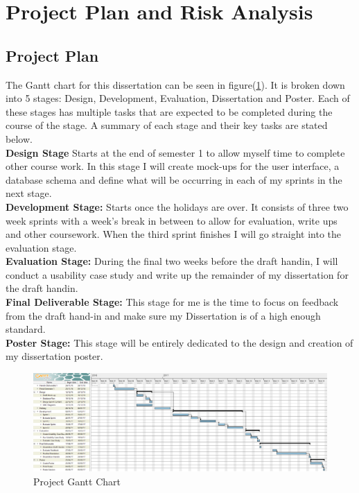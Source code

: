 \documentclass[12pt]{article}  %
\begin{document}
\newpage
\section{Project Plan and Risk Analysis}


\subsection{Project Plan}


The Gantt chart for this dissertation can be seen in figure(\ref{fig:ganttchart}). It is broken down into 5 stages: Design, Development, Evaluation, Dissertation and Poster. Each of these stages has multiple tasks that are expected to be completed during the course of the stage. A summary of each stage and their key tasks are stated below. \\
\textbf{Design Stage} Starts at the end of semester 1 to allow myself time to complete other course work. In this stage I will create mock-ups for the user interface, a database schema and define what will be occurring in each of my sprints in the next stage.\\
\textbf{Development Stage:} Starts once the holidays are over. It consists of three two week sprints with  a week's break in between to allow for evaluation, write ups and other coursework. When the third sprint finishes I will go straight into the evaluation stage.\\
\textbf{Evaluation Stage: } During the final two weeks before the draft handin, I will conduct a usability case study and write up the remainder of my dissertation for the draft handin.\\
\textbf{Final Deliverable Stage:} This stage  for me is the time to focus on feedback from the draft hand-in and make sure my Dissertation is of a high enough standard.\\
\textbf{Poster Stage:} This stage will be entirely dedicated to the design and creation of my dissertation poster.


\begin{figure}[!htbp]

\includegraphics[width=\textwidth]{images/ganttchart.png}
\caption{Project Gantt Chart}
\label{fig:ganttchart}

\end{figure}
\end{document}
